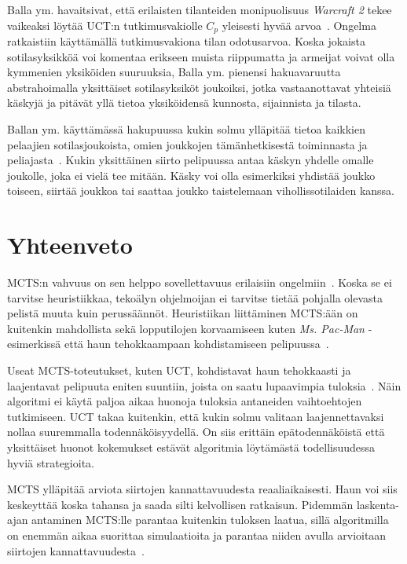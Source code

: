 \documentclass[12pt,finnish]{tktltiki2}
\theoremstyle{definition}
\theoremstyle{remark}
\begin{document}
Balla ym. havaitsivat, että erilaisten tilanteiden monipuolisuus \textit{Warcraft 2} tekee vaikeaksi löytää UCT:n tutkimusvakiolle $C_p$ yleisesti hyvää arvoa~\cite{balla}. Ongelma ratkaistiin käyttämällä tutkimusvakiona tilan odotusarvoa. Koska jokaista sotilasyksikköä voi komentaa erikseen muista riippumatta ja armeijat voivat olla kymmenien yksiköiden suuruuksia, Balla ym. pienensi hakuavaruutta abstrahoimalla yksittäiset sotilasyksiköt joukoiksi, jotka vastaanottavat yhteisiä käskyjä ja pitävät yllä tietoa yksiköidensä kunnosta, sijainnista ja tilasta.

Ballan ym. käyttämässä hakupuussa kukin solmu ylläpitää tietoa kaikkien pelaajien sotilasjoukoista, omien joukkojen tämänhetkisestä toiminnasta ja peliajasta~\cite{balla}. Kukin yksittäinen siirto pelipuussa antaa käskyn yhdelle omalle joukolle, joka ei vielä tee mitään. Käsky voi olla esimerkiksi yhdistää joukko toiseen, siirtää joukkoa tai saattaa joukko taistelemaan vihollissotilaiden kanssa.

\section{Yhteenveto}

MCTS:n vahvuus on sen helppo sovellettavuus erilaisiin ongelmiin~\cite{browne}. Koska se ei tarvitse heuristiikkaa, tekoälyn ohjelmoijan ei tarvitse tietää pohjalla olevasta pelistä muuta kuin perussäännöt. Heuristiikan liittäminen MCTS:ään on kuitenkin mahdollista sekä lopputilojen korvaamiseen kuten \textit{Ms. Pac-Man} -esimerkissä että haun tehokkaampaan kohdistamiseen pelipuussa~\cite{browne}.

Useat MCTS-toteutukset, kuten UCT, kohdistavat haun tehokkaasti ja laajentavat pelipuuta eniten suuntiin, joista on saatu lupaavimpia tuloksia~\cite{browne}. Näin algoritmi ei käytä paljoa aikaa huonoja tuloksia antaneiden vaihtoehtojen tutkimiseen. UCT takaa kuitenkin, että kukin solmu valitaan laajennettavaksi nollaa suuremmalla todennäköisyydellä. On siis erittäin epätodennäköistä että yksittäiset huonot kokemukset estävät algoritmia löytämästä todellisuudessa hyviä strategioita.

MCTS ylläpitää arviota siirtojen kannattavuudesta reaaliaikaisesti. Haun voi siis keskeyttää koska tahansa ja saada silti kelvollisen ratkaisun. Pidemmän laskenta-ajan antaminen MCTS:lle parantaa kuitenkin tuloksen laatua, sillä algoritmilla on enemmän aikaa suorittaa simulaatioita ja parantaa niiden avulla arvioitaan siirtojen kannattavuudesta~\cite{browne}.
\end{document}
